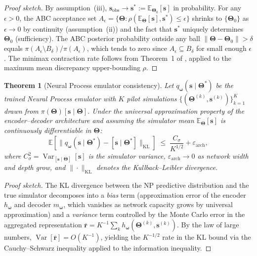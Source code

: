 \documentclass[12pt,a4paper]{article}
\newtheorem{theorem}{Theorem}
\theoremstyle{definition}
\newcommand{\E}{\mathbb{E}}
\newcommand{\Var}{\operatorname{Var}}
\newcommand{\bs}{\bm{s}}
\newcommand{\br}{\bm{r}}
\newcommand{\bTheta}{\bm{\Theta}}
\newcommand{\bomega}{\bm{\omega}}
\begin{document}
\begin{proof}[Proof sketch]
By assumption~(iii), $\bs_{\mathrm{obs}} \to \bs^* := \E_{\bTheta_0}[\bs]$
in probability.  For any $\epsilon > 0$, the ABC acceptance set
$A_\epsilon = \{\bTheta : \rho(\E_\bTheta[\bs], \bs^*) \leq \epsilon\}$
shrinks to $\{\bTheta_0\}$ as $\epsilon \to 0$ by continuity (assumption~(ii))
and the fact that $\bs^*$ uniquely determines $\bTheta_0$ (sufficiency).
The ABC posterior probability outside any ball $\|\bTheta - \bTheta_0\|>\delta$
equals $\pi(A_\epsilon \setminus B_\delta) / \pi(A_\epsilon)$, which tends to
zero since $A_\epsilon \subseteq B_\delta$ for small enough $\epsilon$.
The minimax contraction rate follows from Theorem~1 of \citet{legramanti2025},
applied to the maximum mean discrepancy upper-bounding $\rho$.
\end{proof}

\begin{theorem}[Neural Process emulator consistency]
\label{thm:np-consistency}
Let $q_\bomega(\bs \mid \bTheta^*)$ be the trained Neural Process emulator
with $K$ pilot simulations $\{(\bTheta^{(k)}, \bs^{(k)})\}_{k=1}^K$ drawn
from $\pi(\bTheta)[\bs\mid\bTheta]$.  Under the universal approximation
property of the encoder--decoder architecture and assuming the simulator mean
$\E_\bTheta[\bs]$ is continuously differentiable in $\bTheta$:
\begin{equation}
  \E\!\left[\bigl\|q_\bomega(\bs\mid\bTheta^*) - [\bs\mid\bTheta^*]\bigr\|_{\mathrm{KL}}\right]
  \;\leq\; \frac{C_\sigma}{K^{1/2}} + \varepsilon_{\mathrm{arch}},
  \label{eq:np-bound}
\end{equation}
where $C_\sigma^2 = \Var_{[\bs\mid\bTheta]}[\bs]$ is the simulator variance,
$\varepsilon_{\mathrm{arch}} \to 0$ as network width and depth grow, and
$\|\cdot\|_{\mathrm{KL}}$ denotes the Kullback--Leibler divergence.
\end{theorem}

\begin{proof}[Proof sketch]
The KL divergence between the NP predictive distribution and the true
simulator decomposes into a \emph{bias} term (approximation error of the
encoder $h_\bomega$ and decoder $m_\bomega$, which vanishes as network capacity
grows by universal approximation) and a \emph{variance} term controlled by the
Monte Carlo error in the aggregated representation $\bar{\br} = K^{-1}\sum_k
h_\bomega(\bTheta^{(k)},\bs^{(k)})$.  By the law of large numbers,
$\Var[\bar{\br}] = O(K^{-1})$, yielding the $K^{-1/2}$ rate in the KL bound
via the Cauchy--Schwarz inequality applied to the information inequality.
\end{proof}
\end{document}
